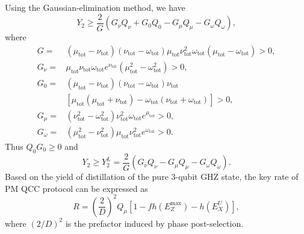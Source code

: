 \documentclass[aps,twocolumn,superscriptaddress,showpacs,nofootinbib]{revtex4-2}
\begin{document}
Using the Gaussian-elimination method, we have
\begin{equation}
Y_2 \geq \frac{2}{G} \left( G_\nu Q_\nu + G_0 Q_0 - G_\mu Q_\mu - G_\omega Q_\omega \right),
\end{equation}
where
\begin{equation}
\begin{split}
G =& (\mu_\text{tot} -  \nu_\text{tot})( \nu_\text{tot} - \omega_\text{tot}) \mu_\text{tot} \nu_\text{tot}^2 \omega_\text{tot}(\mu_\text{tot}-\omega_\text{tot})>0,\\
G_{\nu} =& \mu_\text{tot} \nu_\text{tot} \omega_\text{tot} e^{\nu_\text{tot}}(\mu_\text{tot}^2 - \omega_\text{tot}^2 )>0,\\
G_0  =&(\mu_\text{tot}-\nu_\text{tot}) (\nu_\text{tot}-\omega_\text{tot})\nu_\text{tot}\\
&\left[\mu_\text{tot} (\mu_\text{tot}+ \nu_\text{tot}) - \omega_\text{tot}(\nu_\text{tot}+ \omega_\text{tot})\right]>0,\\
G_\mu =& (\nu_\text{tot}^2 - \omega_\text{tot}^2)\nu_\text{tot}^2\omega_\text{tot}e^{\mu_\text{tot}}>0, \\
G_\omega =& (\mu_\text{tot}^2 - \nu_\text{tot}^2)\mu_\text{tot} \nu_\text{tot}^2e^{\omega_\text{tot}}>0.
\end{split}
\end{equation}
Thus $Q_0G_0\geq0$ and
\begin{equation}
Y_2 \geq Y_2^L = \frac{2}{G} \left( G_\nu Q_\nu - G_\mu Q_\mu - G_\omega Q_\omega \right).
\end{equation}
Based on the yield of distillation of the pure 3-qubit GHZ state, the key rate of PM QCC protocol can be expressed as
\begin{equation} \label{eq:keyrate}
R = \left( \frac{2}{D} \right)^2 Q_\mu \left[1-fh(E_Z^{\max})-h(E^U_{X})\right],
\end{equation}
where $(2/D)^2$ is the prefactor induced by phase post-selection.
\end{document}

